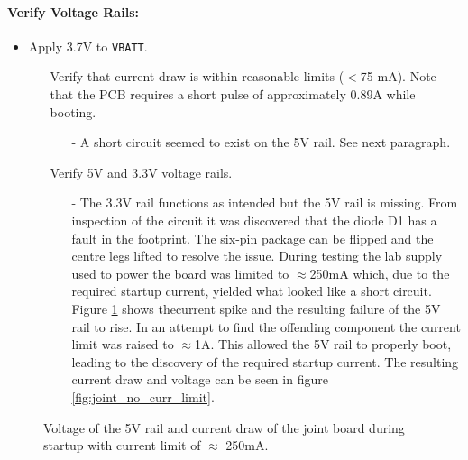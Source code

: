 \paragraph{Verify Voltage Rails:} %
 \label{par:verify_voltage_rails}
 \begin{itemize}
 	\item Apply 3.7V to \texttt{VBATT}.
 	\begin{itemize}
 		\item[\xmark] Verify that current draw is within reasonable limits ($<$75 mA). Note that the PCB requires a short pulse of approximately 0.89A while booting.
 		\begin{itemize}
 			\item[-] A short circuit seemed to exist on the 5V rail.
 			See next paragraph.
 		\end{itemize}
 		\item[\xmark] Verify 5V and 3.3V voltage rails.
 		\begin{itemize}
 			\item[-] The 3.3V rail functions as intended but the 5V rail is missing.
 			From inspection of the circuit it was discovered that the diode D1 has a fault in the footprint.
 			The six-pin package can be flipped and the centre legs lifted to resolve the issue.
 			During testing the lab supply used to power the board was limited to $\approx$250mA which, due to the required startup current, yielded what looked like a short circuit.
 			Figure \ref{fig:joint_curr_limit} shows thecurrent spike and the resulting failure of the 5V rail to rise.
 			In an attempt to find the offending component the current limit was raised to $\approx$1A.
 			This allowed the 5V rail to properly boot, leading to the discovery of the required startup current.
 			The resulting current draw and voltage can be seen in figure \ref{fig:joint_no_curr_limit}.
 		\end{itemize}
 	\end{itemize}
 \end{itemize}

\begin{figure}[h]
	\centering
	
	\caption{Voltage of the 5V rail and current draw of the joint board during startup with current limit of $\approx$ 250mA.}
	\label{fig:joint_curr_limit}
\end{figure}

